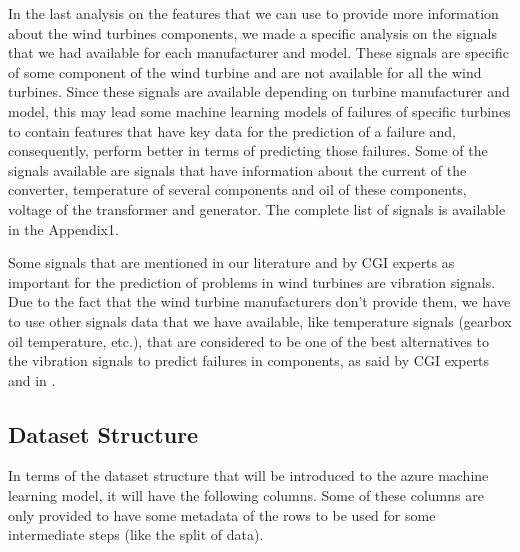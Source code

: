 In the last analysis on the features that we can use to provide more information about the wind turbines components, we made a specific analysis on the signals that we had available for each manufacturer and model. These signals are specific of some component of the wind turbine and are not available for all the wind turbines.
Since these signals are available depending on turbine manufacturer and model, this may lead some machine learning models of failures of specific turbines to contain features that have key data for the prediction of a failure and, consequently, perform better in terms of predicting those failures.
Some of the signals available are signals that have information about the current of the converter, temperature of several components and oil of these components, voltage of the transformer and generator. The complete list of signals is available in the Appendix1.


Some signals that are mentioned in our literature and by CGI experts as important for the prediction of problems in wind turbines are vibration signals. Due to the fact that the wind turbine manufacturers don't provide them, we have to use other signals data that we have available, like temperature signals (gearbox oil temperature, etc.), that are considered to be one of the best alternatives to the vibration signals to predict failures in components, as said by CGI experts and in \cite{OLD_19_WIND}.


\subsection{Dataset Structure} 
\label{sub:if_you_use_this_template} 

In terms of the dataset structure that will be introduced to the azure machine learning model, it will have the following columns. Some of these columns are only provided to have some metadata of the rows to be used for some intermediate steps (like the split of data).

